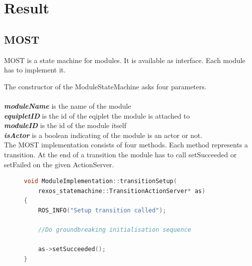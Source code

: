 \documentclass[12pt,a4paper]{report}
\begin{document}
\section{Result}
\subsection{MOST}

\begin{figure}
\end{figure}

MOST is a state machine for modules.
It is available as interface.
Each module has to implement it. 

The constructor of the ModuleStateMachine asks four parameters. \\
\\
\textbf{\textit{moduleName}} is the name of the module \\
\textbf{\textit{equipletID}} is the id of the eqiplet the module is attached to \\
\textbf{\textit{moduleID}} is the id of the module itself \\
\textbf{\textit{isActor}} is a boolean indicating of the module is an actor or not. \\

\noindent
The MOST implementation consists of four methods.
Each method represents a transition.
At the end of a transition the module has to call setSucceeded or setFailed on the given ActionServer.

\begin{figure}[H]
\begin{lstlisting}[language=c++, frame=single, caption=Sample transition]
void ModuleImplementation::transitionSetup(
	rexos_statemachine::TransitionActionServer* as) 
{
	ROS_INFO("Setup transition called");

	//Do groundbreaking initialisation sequence

	as->setSucceeded();
}
\end{lstlisting}
\end{figure}
\end{document}
